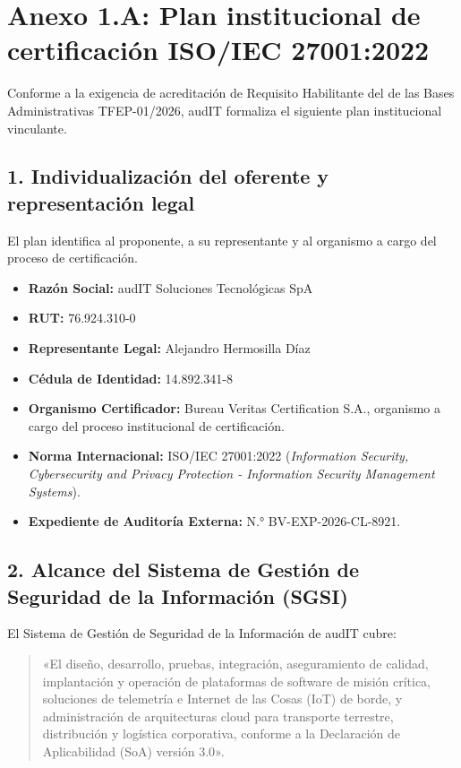 
\section*{Anexo 1.A: Plan institucional de certificación ISO/IEC 27001:2022}\label{sec:1-anexo-iso}

Conforme a la exigencia de acreditación de Requisito Habilitante del  de las Bases Administrativas TFEP-01/2026, audIT formaliza el siguiente plan institucional vinculante.

\subsection*{1. Individualización del oferente y representación legal}
El plan identifica al proponente, a su representante y al organismo a cargo del proceso de certificación.
\begin{itemize}
  \item \textbf{Razón Social:} audIT Soluciones Tecnológicas SpA
  \item \textbf{RUT:} 76.924.310-0
  \item \textbf{Representante Legal:} Alejandro Hermosilla Díaz
  \item \textbf{Cédula de Identidad:} 14.892.341-8
  \item \textbf{Organismo Certificador:} Bureau Veritas Certification S.A., organismo a cargo del proceso institucional de certificación.
  \item \textbf{Norma Internacional:} ISO/IEC 27001:2022 (\textit{Information Security, Cybersecurity and Privacy Protection - Information Security Management Systems}).
  \item \textbf{Expediente de Auditoría Externa:} N.° BV-EXP-2026-CL-8921.
\end{itemize}

\subsection*{2. Alcance del Sistema de Gestión de Seguridad de la Información (SGSI)}
El Sistema de Gestión de Seguridad de la Información de audIT cubre:
\begin{quote}
«El diseño, desarrollo, pruebas, integración, aseguramiento de calidad, implantación y operación de plataformas de software de misión crítica, soluciones de telemetría e Internet de las Cosas (IoT) de borde, y administración de arquitecturas cloud para transporte terrestre, distribución y logística corporativa, conforme a la Declaración de Aplicabilidad (SoA) versión 3.0».
\end{quote}

